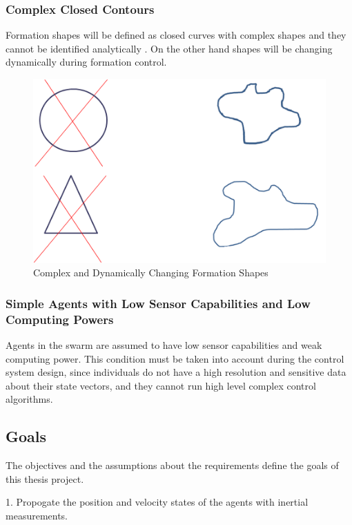 \documentclass[twoside]{article}
\begin{document}
\subsubsection{Complex Closed Contours}
Formation shapes will be defined as closed curves with complex shapes and they cannot be identified analytically . On the other hand shapes will be changing dynamically during formation control. 

\begin{figure}[H]
	\caption{Complex and Dynamically Changing Formation Shapes}
	\centering
	\includegraphics[scale = 1]{complex}
\end{figure} 



\subsubsection{Simple Agents with Low Sensor Capabilities and Low Computing Powers}


Agents in the swarm are assumed to have low sensor capabilities and weak computing power. This 
condition must be taken into account during the control system design, since individuals do not have a high resolution and sensitive data about their state vectors, and they cannot run high level complex control algorithms.


\subsection{Goals}

The objectives and the assumptions about the requirements define the goals of this thesis project. 

1. Propogate the position and velocity states of the agents with inertial measurements.
\end{document}
